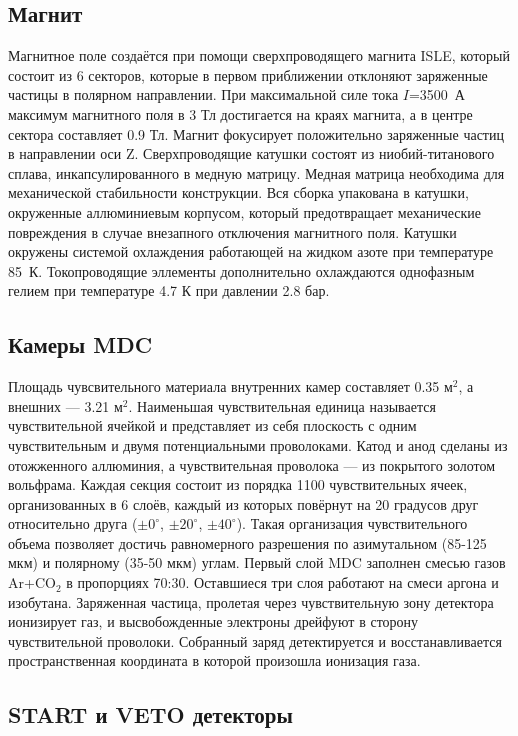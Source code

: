 \subsection{ Магнит }

Магнитное поле создаётся при помощи сверхпроводящего магнита ISLE, который состоит из 6 секторов, которые в первом приближении отклоняют заряженные частицы в полярном направлении.
При максимальной силе тока $I$=3500~А максимум магнитного поля в 3 Тл достигается на краях магнита, а в центре сектора составляет 0.9 Тл.
Магнит фокусирует положительно заряженные частиц в направлении оси Z.
Сверхпроводящие катушки состоят из ниобий-титанового сплава, инкапсулированного в медную матрицу.
Медная матрица необходима для механической стабильности конструкции.
Вся сборка упакована в катушки, окруженные аллюминиевым корпусом, который предотвращает механические повреждения в случае внезапного отключения магнитного поля.
Катушки окружены системой охлаждения работающей на жидком азоте при температуре 85~К.
Токопроводящие эллементы дополнительно охлаждаются однофазным гелием при температуре 4.7 К при давлении 2.8 бар.

\subsection{ Камеры MDC }

Площадь чувсвительного материала внутренних камер составляет 0.35 м$^2$, а внешних --- 3.21 м$^2$.
Наименьшая чувствительная единица называется чувствительной ячейкой и представляет из себя плоскость с одним чувствительным и двумя потенциальными проволоками.
Катод и анод сделаны из отожженного аллюминия, а чувствительная проволока --- из покрытого золотом вольфрама.
Каждая секция состоит из порядка 1100 чувствительных ячеек, организованных в 6 слоёв, каждый из которых повёрнут на 20 градусов друг относительно друга ($\pm0^{\circ}$, $\pm20^{\circ}$, $\pm40^{\circ}$).
Такая организация чувствительного объема позволяет достичь равномерного разрешения по азимутальном (85-125 мкм) и полярному (35-50 мкм) углам.
Первый слой MDC заполнен смесью газов Ar+CO$_{2}$ в пропорциях 70:30.
Оставшиеся три слоя работают на смеси аргона и изобутана. 
Заряженная частица, пролетая через чувствительную зону детектора ионизирует газ, и высвобожденные электроны дрейфуют в сторону чувствительной проволоки.
Собранный заряд детектируется и восстанавливается пространственная координата в которой произошла ионизация газа.

\subsection{START и VETO детекторы}

